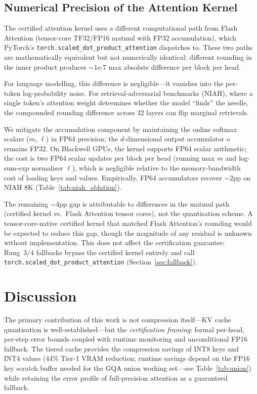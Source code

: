 \documentclass[11pt,a4paper]{article}
\theoremstyle{definition}
\theoremstyle{remark}
\newcommand{\torchsdpa}{\texttt{torch.scaled\_dot\_\hspace{0pt}product\_attention}}
\begin{document}
\subsection{Numerical Precision of the Attention Kernel}
\label{sec:numerical}

The certified attention kernel uses a different computational path from Flash Attention (tensor-core TF32/FP16 matmul with FP32 accumulation), which PyTorch's \torchsdpa{} dispatches to.  These two paths are mathematically equivalent but not numerically identical: different rounding in the inner product produces ${\sim}$1e-7 max absolute difference per block per head.

For language modelling, this difference is negligible---it vanishes into the per-token log-probability noise.  For retrieval-adversarial benchmarks (NIAH), where a single token's attention weight determines whether the model ``finds'' the needle, the compounded rounding difference across 32 layers can flip marginal retrievals.

We mitigate the accumulation component by maintaining the online softmax scalars ($m$, $\ell$) in FP64 precision; the $d$-dimensional output accumulator $o$ remains FP32.  On Blackwell GPUs, the kernel supports FP64 scalar arithmetic; the cost is two FP64 scalar updates per block per head (running max $m$ and log-sum-exp normaliser $\ell$), which is negligible relative to the memory-bandwidth cost of loading keys and values.  Empirically, FP64 accumulators recover $\sim$2pp on NIAH 8K (Table~\ref{tab:niah_ablation}).

The remaining $\sim$4pp gap is attributable to differences in the matmul path (certified kernel vs.\ Flash Attention tensor cores), not the quantisation scheme.  A tensor-core-native certified kernel that matched Flash Attention's rounding would be expected to reduce this gap, though the magnitude of any residual is unknown without implementation.  This does not affect the certification guarantee: Rung~3/4 fallbacks bypass the certified kernel entirely and call \torchsdpa{} (Section~\ref{sec:fallback}).


\section{Discussion}
\label{sec:discussion}

The primary contribution of this work is not compression itself---KV cache quantisation is well-established---but the \emph{certification framing}: formal per-head, per-step error bounds coupled with runtime monitoring and unconditional FP16 fallback.  The tiered cache provides the compression savings of INT8 keys and INT4 values (44\% Tier-1 VRAM reduction; runtime savings depend on the FP16 key scratch buffer needed for the GQA union working set---see Table~\ref{tab:union}) while retaining the error profile of full-precision attention as a guaranteed fallback.
\end{document}
